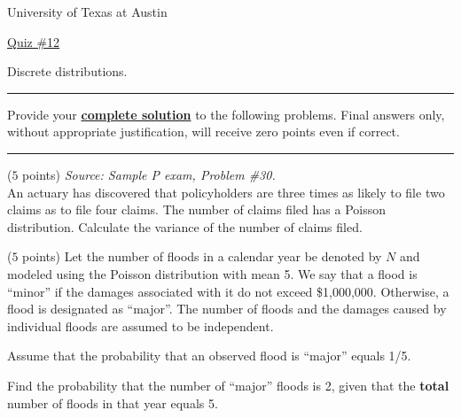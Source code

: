 \documentclass[reqno,letterpaper, onsided,10pt]{amsart}
\newcommand{\sol}[1]{\par\noindent{\bf Solution:} #1}
\renewcommand{\sol}[1]{}
\newcommand{\hwnum}{12}
\begin{document}
\begin{center}
{{\sc University of Texas at Austin}}
\end{center}
\vspace{1ex}

\begin{center}
\underline{\Large Quiz \#\hwnum}\\

\medskip

{\large Discrete distributions.} 
\end{center}

\bigskip
\hrule
\bigskip

{\color{blue} Provide your \underline{\bf complete solution} to the following problems. Final answers only, without appropriate justification, will receive zero points even if correct.}

\bigskip
\hrule
\bigskip

\setcounter{section}{\hwnum}

\begin{problem} ($5$ points) %
{\em Source: Sample P exam, Problem \#30.}\\
An actuary has discovered that policyholders are three times as likely to file two claims as to file four claims. The number of claims filed has a Poisson distribution. Calculate the variance of the number of claims filed.

\end{problem}

\sol{{\bf (d)}\\
Let $N$ denote the number of claims. We are given that
\begin{equation}\nonumber
  \begin{split}
    \PP[N=2] = 3\PP[N=4] \quad \Rightarrow \quad
      e^{-\lambda} \frac{\lambda^2}{2!} = 3e^{-\lambda} \frac{\lambda^4}{4!}
  \end{split}
\end{equation}
where $\lambda$ denotes the parameter of the Poisson distribution. The above equation yields that $\lambda^2=4$, so that $\lambda=2$. Since the variance of the Poisson distribution equals its parameter value, our answer is $2$.
}

\medskip

\begin{problem} ($5$ points) 
Let the number of floods in a calendar year be denoted by $N$ and
modeled using the Poisson distribution with mean 5.  We say that a
flood is ``minor'' if the damages associated with it do not exceed
\$1,000,000. Otherwise, a flood is designated as ``major''.  The
number of floods and the damages caused by individual floods are
assumed to be independent.

Assume that the probability that an observed  flood is ``major''
equals 1/5. 

Find the probability that the number of ``major'' floods is 2, 
given that the {\bf total} number of floods in that year equals 5. 
\end{problem}
\end{document}
